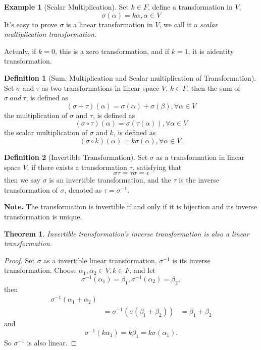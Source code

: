 \documentclass{article}
\newtheorem{theorem}{Theorem}[section]
\theoremstyle{definition}
\newtheorem{defi}{Definition}[section]
\newtheorem{example}{Example}[defi]
\begin{document}
\begin{example}[Scalar Multiplication]
    Set $k\in F$, define a transformation in $V$,
    $$\sigma (\alpha)=k \alpha, \alpha\in V$$
    It's easy to prove $\sigma$ is a linear transformation in $V$, 
    we call it a \textit{scalar multiplication transformation}.
\end{example}

Actualy, if $k=0$, this is a zero transformation, and if $k=1$, it is aidentity transformation.

\begin{defi}[Sum, Multiplication and Scalar multiplication of Transformation]
    Set $\sigma$ and $\tau$ as two transformations in linear space $V$, 
    $k\in F$, then the sum of $\sigma\ and\ \tau$, is defined as 
    $$(\sigma+\tau)(\alpha)=\sigma(\alpha)+\sigma(\beta),\forall \alpha\in V$$
    the multiplication of $\sigma$ and $\tau$, is defined as 
    $$(\sigma\circ\tau)(\alpha)=\sigma(\tau(\alpha)),\forall \alpha\in V$$
    the scalar multiplication of $\sigma$ and $k$, is defined as
    $$(\sigma\circ k)(\alpha)=k\sigma(\alpha),\forall \alpha\in V.$$
\end{defi}

\begin{defi}[Invertible Transformation]
    Set $\sigma$ as a transformation in linear space $V$, 
    if there exists a transformation $\tau$, satisfying that 
    $$\sigma \tau=\tau\sigma=\epsilon$$
    then we say $\sigma$ is an invertible transformation, and the 
    $\tau$ is the inverse transformation of $\sigma$, denoted as $\tau=\sigma^{-1}.$
\end{defi}

\textbf{Note.} The transformation is invertible if and only if it is bijection and its inverse 
transformation is unique.

\begin{theorem}
    Invertible transformation's inverse transformation is also a linear transformation.
\end{theorem}
\begin{proof}
    Set $\sigma$ as a invertible linear transformation, $\sigma^{-1}$ is its inverse transformation.
    Choose $\alpha_{1},\alpha_{2}\in V,k\in F$, and let
    $$\sigma^{-1}(\alpha_{1})=\beta_{1},\sigma^{-1}(\alpha_{2})=\beta_{2},$$
    then 
    \begin{align*}
        \sigma^{-1}(\alpha_{1}+\alpha_{2})\\
        & = \sigma^{-1}(\sigma(\beta_{1}+\beta_{2}))
        & = \beta_{1}+\beta_{2}
    \end{align*}
    and
    $$\sigma^{-1}(k\alpha_{1})=k\beta_{1}=k\sigma(\alpha_{1}).$$
    So $\sigma^{-1}$ is also linear.
\end{proof}
\end{document}
